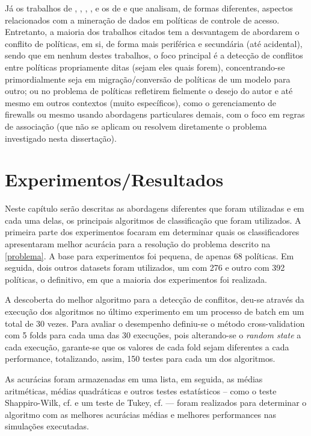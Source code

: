 Já os trabalhos de , , , ,  e os de  e  que analisam, de formas diferentes, aspectos relacionados com a mineração de dados em políticas de controle de acesso. Entretanto, a maioria dos trabalhos citados tem a desvantagem de abordarem o conflito de políticas, em si, de forma mais periférica e secundária (até acidental), sendo que em nenhum destes trabalhos, o foco principal é a detecção de conflitos entre políticas propriamente ditas (sejam eles quais forem), concentrando-se primordialmente seja em migração/conversão de políticas de um modelo para outro; ou no problema de políticas refletirem fielmente o desejo do autor e até mesmo em outros contextos (muito específicos), como o gerenciamento de firewalls ou mesmo usando abordagens particulares demais, com o foco em regras de associação (que não se aplicam ou resolvem diretamente o problema investigado nesta dissertação).

\chapter{Experimentos/Resultados}\label{resultados}
Neste capítulo serão descritas as abordagens diferentes que foram utilizadas e em cada uma delas, os principais algoritmos de classificação que foram utilizados. A primeira parte dos experimentos focaram em determinar quais os classificadores apresentaram melhor acurácia para a resolução do problema descrito na \autoref{problema}. A base para experimentos foi pequena, de apenas 68 políticas. Em seguida, dois outros datasets foram utilizados, um com 276 e outro com 392 políticas, o definitivo, em que a maioria dos experimentos foi realizada. 

A descoberta do melhor algoritmo para a detecção de conflitos, deu-se através da execução dos algoritmos no último experimento em um processo de batch em um total de 30 vezes. Para avaliar o desempenho definiu-se o método cross-validation com 5 folds para cada uma das 30 execuções, pois alterando-se o \textit{random state} a cada execução, garante-se que os valores de cada fold sejam diferentes a cada performance, totalizando, assim, 150 testes para cada um dos algoritmos. 

As acurácias foram armazenadas em uma lista, em seguida, as médias aritméticas, médias quadráticas e outros testes estatísticos  -- como o teste Shappiro-Wilk, cf.  e um teste de Tukey, cf.  --- foram realizados para determinar o algoritmo com as melhores acurácias médias e melhores performances nas simulações executadas. 

